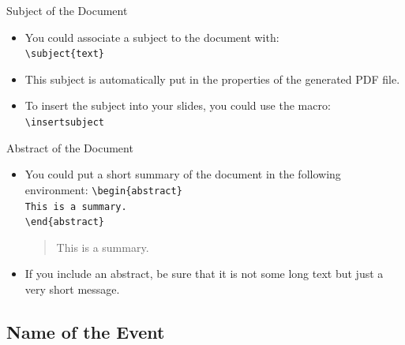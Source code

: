 \documentclass[english,sectioncirclenumberstyle]{le2iutbmbeamer}
\begin{document}
\begin{frame}{Subject of the Document}
	\begin{itemize}
	\item You could associate a subject to the document with: \\
		\texttt{{\textbackslash}subject\{text\}}
	\vspace{1em}
	\item This subject is automatically put in the properties of the generated PDF file.
	\vspace{1em}
	\item To insert the subject into your slides, you could use the macro: \\
			\texttt{{\textbackslash}insertsubject}
	\end{itemize}
	\begin{example}
		\insertsubject
	\end{example}
\end{frame}

\begin{frame}{Abstract of the Document}
	\begin{itemize}
	\item You could put a short summary of the document in the following environment:
		\texttt{{\textbackslash}begin\{abstract\}} \\
		\texttt{This is a summary.} \\
		\texttt{{\textbackslash}end\{abstract\}}
	\vspace{1em}
	\begin{abstract}
		This is a summary.
	\end{abstract}
	\item If you include an abstract, be sure that it is not some long text but just a very short message.
	\end{itemize}
\end{frame}

\subsection{Name of the Event}
\end{document}

